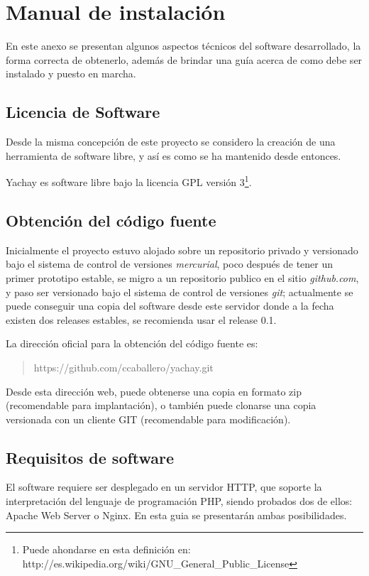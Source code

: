 \chapter{Manual de instalación}
En este anexo se presentan algunos aspectos técnicos del software desarrollado,
la forma correcta de obtenerlo, además de brindar una guía acerca de como debe
ser instalado y puesto en marcha.

\section{Licencia de Software}
Desde la misma concepción de este proyecto se considero la creación de una
herramienta de software libre, y así es como se ha mantenido desde entonces.

Yachay es software libre bajo la licencia GPL versión 3\footnote{Puede ahondarse
en esta definición en:
http://es.wikipedia.org/wiki/GNU\_General\_Public\_License}.

\section{Obtención del código fuente}
Inicialmente el proyecto estuvo alojado sobre un repositorio privado y
versionado bajo el sistema de control de versiones \emph{mercurial}, poco
después de tener un primer prototipo estable, se migro a un repositorio
publico en el sitio \emph{github.com}, y paso ser versionado bajo el sistema de
control de versiones \emph{git}; actualmente se puede conseguir una copia del
software desde este servidor donde a la fecha existen dos releases estables, se
recomienda usar el release 0.1.

La dirección oficial para la obtención del código fuente es:
\begin{quote}
https://github.com/ccaballero/yachay.git
\end{quote}

Desde esta dirección web, puede obtenerse una copia en formato zip
(recomendable para implantación), o también puede clonarse una copia versionada
con un cliente GIT (recomendable para modificación).

\section{Requisitos de software}
El software requiere ser desplegado en un servidor HTTP, que soporte la
interpretación del lenguaje de programación PHP, siendo probados dos de
ellos: Apache Web Server o Nginx. En esta guia se presentarán ambas
posibilidades.

